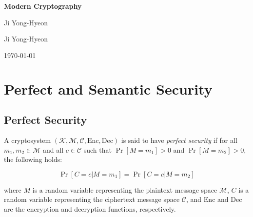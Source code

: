 \documentclass[12pt,openany]{book}
\theoremstyle{definition}
\begin{document}
	
	\begin{titlepage}
		\begin{center}
			{\Huge\textsf{\textbf{Modern Cryptography}}\par}
			\vspace{0.5in}
			{\Large Ji Yong-Hyeon\par}
			\vspace{1in}
			\vspace{1in}
			{\large Ji Yong-Hyeon\par}
			{\large \today\par}
		\end{center}
	\end{titlepage}
	
	\tableofcontents
	
	\mainmatter
	
	\chapter{Perfect and Semantic Security}
	
	\section{Perfect Security}
	
	A cryptosystem $(\mathcal{K}, \mathcal{M}, \mathcal{C}, \text{Enc}, \text{Dec})$ is said to have \textit{perfect security} if for all $m_1, m_2 \in \mathcal{M}$ and all $c \in \mathcal{C}$ such that $\Pr[M = m_1] > 0$ and $\Pr[M = m_2] > 0$, the following holds:
	
	\begin{equation}
		\Pr[C = c | M = m_1] = \Pr[C = c | M = m_2]
	\end{equation}
	
	\noindent where $M$ is a random variable representing the plaintext message space $\mathcal{M}$, $C$ is a random variable representing the ciphertext message space $\mathcal{C}$, and $\text{Enc}$ and $\text{Dec}$ are the encryption and decryption functions, respectively.
	
\end{document}
